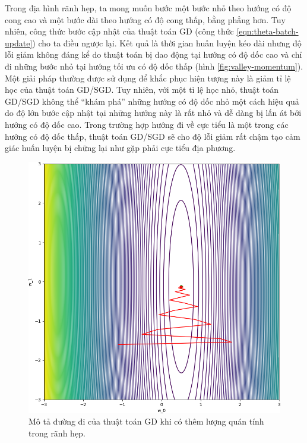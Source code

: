 Trong địa hình rãnh hẹp, ta mong muốn bước một bước nhỏ theo hướng có độ cong cao và một bước dài theo hướng có độ cong thấp, bằng phẳng hơn. Tuy nhiên, công thức bước cập nhật của thuật toán GD (công thức \ref{eqn:theta-batch-update}) cho ta điều ngược lại. Kết quả là thời gian huấn luyện kéo dài nhưng độ lỗi giảm không đáng kể do thuật toán bị dao động tại hướng có độ dốc cao và chỉ đi những bước nhỏ tại hướng tối ưu có độ dốc thấp (hình \ref{fig:valley-momentum}). Một giải pháp thường được sử dụng để khắc phục hiện tượng này là giảm tỉ lệ học của thuật toán GD/SGD. Tuy nhiên, với một tỉ lệ học nhỏ, thuật toán GD/SGD không thể ``khám phá'' những hướng có độ dốc nhỏ một cách hiệu quả do độ lớn bước cập nhật tại những hướng này là rất nhỏ và dễ dàng bị lấn át bởi hướng có độ dốc cao. Trong trường hợp hướng đi về cực tiểu là một trong các hướng có độ dốc thấp, thuật toán GD/SGD sẽ cho độ lỗi giảm rất chậm tạo cảm giác huấn luyện bị chững lại như gặp phải cực tiểu địa phương.

\begin{figure}[htp]
	\centering
	\includegraphics[width=85 mm]{images/gdm.png}
	\caption{Mô tả đường đi của thuật toán GD khi có thêm lượng quán tính trong rãnh hẹp.}
	\label{fig:gd-m}
\end{figure}

